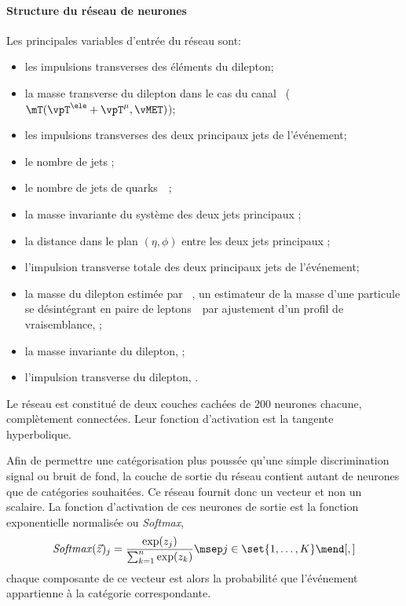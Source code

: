 \paragraph{Structure du réseau de neurones}
Les principales variables d'entrée du réseau sont:
\begin{itemize}
\item les impulsions transverses des éléments du dilepton;
\item la masse transverse du dilepton dans le cas du canal \ele\mu\ ($\mT(\vpT^{\ele}+\vpT^{\mu},\vMET)$);
\item les impulsions transverses des deux principaux jets de l'événement;
\item le nombre de jets \Njets;
\item le nombre de jets de quarks~\quarkb\ \Nbjets;
\item la masse invariante du système des deux jets principaux \mjj;
\item la distance dans le plan $(\eta,\phi)$ entre les deux jets principaux \Detajj;
\item l'impulsion transverse totale des deux principaux jets de l'événement;
\item la masse du dilepton estimée par \SVFIT~\cite{SVFit_Bianchini_2014},
un estimateur de la masse d'une particule se désintégrant en paire de leptons~\tau\ par ajustement d'un profil de vraisemblance,
\msv;
\item la masse invariante du dilepton, \mvis;
\item l'impulsion transverse du dilepton, \pTvis.
\end{itemize}
Le réseau est constitué de deux couches cachées de 200 neurones chacune, complètement connectées.
Leur fonction d'activation est la tangente hyperbolique.
\par
Afin de permettre une catégorisation plus poussée qu'une simple discrimination signal ou bruit de fond, la couche de sortie du réseau contient autant de neurones que de catégories souhaitées.
Ce réseau fournit donc un vecteur et non un scalaire.
La fonction d'activation de ces neurones de sortie est la fonction exponentielle normalisée ou \emph{Softmax},
\begin{equation}
\mathit{Softmax}(\vec{z})_j = \frac{\exp(z_j)}{\sum_{k=1}^n \exp(z_k)}
\msep
j\in\set{1,\ldots,K}
\mend[,]
\end{equation}
chaque composante de ce vecteur est alors la probabilité que l'événement appartienne à la catégorie correspondante.
